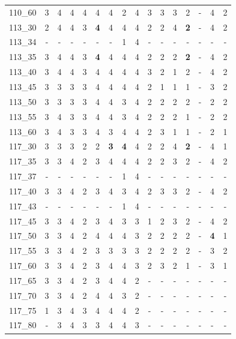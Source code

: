 {\begin{longtable}{lccccccccccccccc}
110\_60 & 3 & 4 & 4 & 4 & 4 & 4 & 2 & 4 & 3 & 3 & 3 & 2 & - & 4 & 2 \\
113\_30 & 2 & 4 & 4 & 3 & \cellcolor{green!20}\textbf{4} & 4 & 4 & 4 & 2 & 2 & 4 & \cellcolor{green!20}\textbf{2} & - & 4 & 2 \\
113\_34 & - & - & - & - & - & - & 1 & 4 & - & - & - & - & - & - & - \\
113\_35 & 3 & 4 & 4 & 3 & \cellcolor{green!20}\textbf{4} & 4 & 4 & 4 & 2 & 2 & 2 & \cellcolor{green!20}\textbf{2} & - & 4 & 2 \\
113\_40 & 3 & 4 & 4 & 3 & 4 & 4 & 4 & 4 & 3 & 2 & 1 & 2 & - & 4 & 2 \\
113\_45 & 3 & 3 & 3 & 3 & 4 & 4 & 4 & 4 & 2 & 1 & 1 & 1 & - & 3 & 2 \\
113\_50 & 3 & 3 & 3 & 3 & 4 & 4 & 3 & 4 & 2 & 2 & 2 & 2 & - & 2 & 2 \\
113\_55 & 3 & 4 & 3 & 3 & 4 & 4 & 3 & 4 & 2 & 2 & 2 & 1 & - & 2 & 2 \\
113\_60 & 3 & 4 & 3 & 3 & 4 & 3 & 4 & 4 & 2 & 3 & 1 & 1 & - & 2 & 1 \\
117\_30 & 3 & 3 & 3 & 2 & 2 & \cellcolor{green!20}\textbf{3} & \cellcolor{green!20}\textbf{4} & 4 & 2 & 2 & 4 & \cellcolor{green!20}\textbf{2} & - & 4 & 1 \\
117\_35 & 3 & 3 & 4 & 2 & 3 & 4 & 4 & 4 & 2 & 2 & 3 & 2 & - & 4 & 2 \\
117\_37 & - & - & - & - & - & - & 1 & 4 & - & - & - & - & - & - & - \\
117\_40 & 3 & 3 & 4 & 2 & 3 & 4 & 3 & 4 & 2 & 3 & 3 & 2 & - & 4 & 2 \\
117\_43 & - & - & - & - & - & - & 1 & 4 & - & - & - & - & - & - & - \\
117\_45 & 3 & 3 & 4 & 2 & 3 & 4 & 3 & 3 & 1 & 2 & 3 & 2 & - & 4 & 2 \\
117\_50 & 3 & 3 & 4 & 2 & 4 & 4 & 4 & 3 & 2 & 2 & 2 & 2 & - & \cellcolor{green!20}\textbf{4} & 1 \\
117\_55 & 3 & 3 & 4 & 2 & 3 & 3 & 3 & 3 & 2 & 2 & 2 & 2 & - & 3 & 2 \\
117\_60 & 3 & 3 & 4 & 2 & 3 & 4 & 4 & 3 & 2 & 3 & 2 & 1 & - & 3 & 1 \\
117\_65 & 3 & 3 & 4 & 2 & 3 & 4 & 4 & 2 & - & - & - & - & - & - & - \\
117\_70 & 3 & 3 & 4 & 2 & 4 & 4 & 3 & 2 & - & - & - & - & - & - & - \\
117\_75 & 1 & 3 & 4 & 3 & 4 & 4 & 4 & 2 & - & - & - & - & - & - & - \\
117\_80 & - & 3 & 4 & 3 & 3 & 4 & 4 & 3 & - & - & - & - & - & - & - \\

\end{longtable}}
